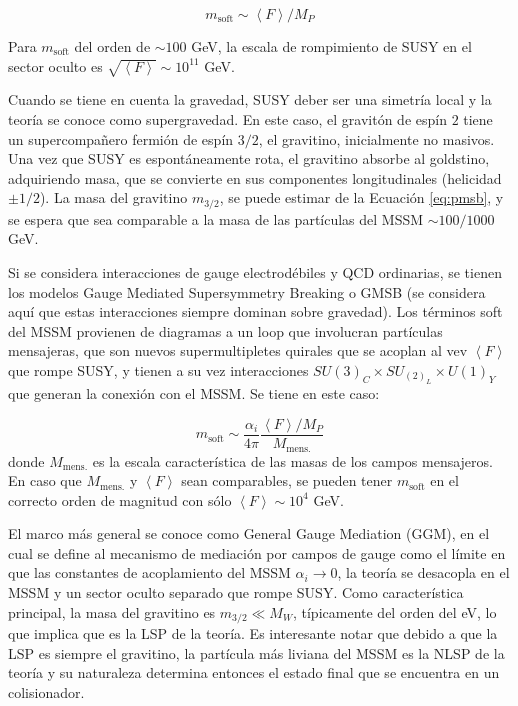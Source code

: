 \begin{equation}
m_{\text{soft}} \sim \left< F \right>/M_P
\label{eq:pmsb}
\end{equation}

Para $m_{\text{soft}}$ del orden de $\sim 100$ GeV, la escala de rompimiento de SUSY en el sector oculto es $\sqrt{\left< F \right>}\sim 10^{11}$ GeV.

Cuando se tiene en cuenta la gravedad, SUSY deber ser una simetría local y la
teoría se conoce como supergravedad. En este caso, el gravitón de espín $2$ tiene un
supercompañero fermión de espín $3/2$, el gravitino, inicialmente no masivos. Una vez
que SUSY es espontáneamente rota, el gravitino absorbe al goldstino, adquiriendo
masa, que se convierte en sus componentes longitudinales (helicidad $\pm1/2$). La masa
del gravitino $m_{3/2}$, se puede estimar de la Ecuación \ref{eq:pmsb}, y se espera que sea comparable
a la masa de las partículas del MSSM $\sim100/1000$ GeV.

Si se considera interacciones de gauge electrodébiles y QCD ordinarias, se tienen
los modelos Gauge Mediated Supersymmetry Breaking o GMSB \cite{gmsb1, gmsb2, gmsb3} (se considera aquí que estas interacciones siempre dominan sobre gravedad). Los términos
soft del MSSM provienen de diagramas a un loop que involucran partículas mensajeras, que son nuevos supermultipletes quirales que se acoplan al vev $\left< F \right>$ que
rompe SUSY, y tienen a su vez interacciones $SU(3)_C \times SU_(2)_L \times U(1)_Y$ que generan
la conexión con el MSSM. Se tiene en este caso:

\begin{equation}
m_{\text{soft}} \sim \frac{\alpha_i}{4\pi}\frac{\left< F \right>/M_P}{M_\text{mens.}}
\label{eq:gmsb}
\end{equation}
%
donde $M_\text{mens.}$ es la escala característica de las masas de los campos mensajeros. En
caso que $M_\text{mens.}$ y $\left< F \right>$ sean comparables, se pueden tener $m_{\text{soft}}$ en el correcto
orden de magnitud con sólo $\left< F \right>\sim 10^4$ GeV.

El marco más general se conoce como General Gauge Mediation (GGM), en el
cual se define al mecanismo de mediación por campos de gauge como el límite en
que las constantes de acoplamiento del MSSM $\alpha_i\to 0$, la teoría se desacopla en el
MSSM y un sector oculto separado que rompe SUSY. Como característica principal, la masa del
gravitino es $m_{3/2} \ll M_W$, típicamente del orden del eV, lo que implica que es la LSP
de la teoría. Es interesante notar que debido a que la LSP es siempre el gravitino, la
partícula más liviana del MSSM es la NLSP de la teoría y su naturaleza determina
entonces el estado final que se encuentra en un colisionador.

